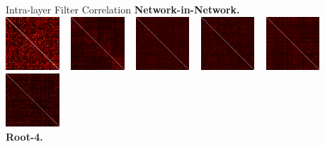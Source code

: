\documentclass[t,xcolor=dvipsnames]{beamer}
\begin{document}
\begin{frame}[fragile]{Intra-layer Filter Correlation}
\textbf{Network-in-Network.}\\
    \includegraphics[width=0.15\textwidth]{../Figs/Raster/ninroot4/corrcoef_conv2.png}
~
    \includegraphics[width=0.15\textwidth]{../Figs/Raster/ninroot4/corrcoef_conv4.png}
~
    \includegraphics[width=0.15\textwidth]{../Figs/Raster/ninroot4/corrcoef_conv5.png}
~
    \includegraphics[width=0.15\textwidth]{../Figs/Raster/ninroot4/corrcoef_conv6.png}
~
    \includegraphics[width=0.15\textwidth]{../Figs/Raster/ninroot4/corrcoef_conv8.png}
~
    \includegraphics[width=0.15\textwidth]{../Figs/Raster/ninroot4/corrcoef_conv9.png}\\
\textbf{Root-4.}\\

\end{frame}
\end{document}
